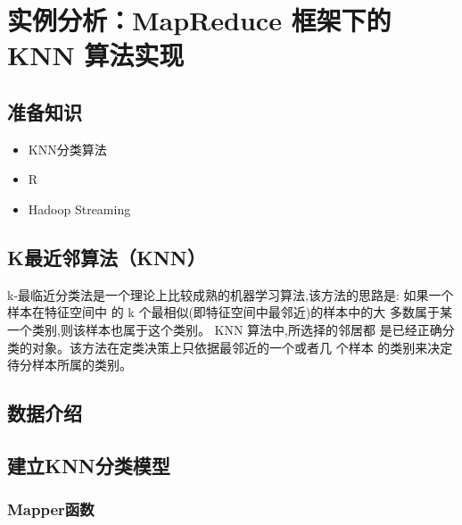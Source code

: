\section{实例分析：MapReduce 框架下的 KNN
算法实现}\label{ux5b9eux4f8bux5206ux6790mapreduce-ux6846ux67b6ux4e0bux7684-knn-ux7b97ux6cd5ux5b9eux73b0}

\subsection{准备知识}\label{ux51c6ux5907ux77e5ux8bc6}

\begin{itemize}
\itemsep1pt\parskip0pt
\item
  KNN分类算法
\item
  R
\item
  Hadoop Streaming
\end{itemize}

\subsection{K最近邻算法（KNN）}\label{kux6700ux8fd1ux90bbux7b97ux6cd5knn}

k-最临近分类法是一个理论上比较成熟的机器学习算法,该方法的思路是:
如果一个样本在特征空间中 的 k 个最相似(即特征空间中最邻近)的样本中的大
多数属于某一个类别,则该样本也属于这个类别。 KNN 算法中,所选择的邻居都
是已经正确分类的对象。该方法在定类决策上只依据最邻近的一个或者几 个样本
的类别来决定待分样本所属的类别。

\subsection{数据介绍}\label{ux6570ux636eux4ecbux7ecd}

\subsection{建立KNN分类模型}\label{ux5efaux7acbknnux5206ux7c7bux6a21ux578b}

\subsubsection{Mapper函数}\label{mapperux51fdux6570}

